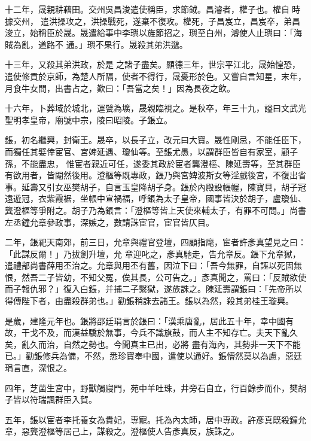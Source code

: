 \begin{pinyinscope}
 十二年，晟親耕藉田。交州吳昌浚遣使稱臣，求節鉞。昌濬者，權子也。權自時據交州，遣洪操攻之，洪操戰死，遂棄不復攻。權死，子昌岌立，昌岌卒，弟昌浚立，始稱臣於晟。晟遣給事中李璵以旌節招之，璵至白州，濬使人止璵曰：「海賊為亂，道路不
 通。」璵不果行。晟殺其弟洪邈。



 十三年，又殺其弟洪政，於是之諸子盡矣。顯德三年，世宗平江北，晟始惶恐，遣使修貢於京師，為楚人所隔，使者不得行，晟憂形於色。又嘗自言知星，末年，月食牛女間，出書占之，歎曰：「吾當之矣！」因為長夜之飲。



 十六年，卜葬域於城北，運甓為壙，晟親臨視之。是秋卒，年三十九，謚曰文武光聖明孝皇帝，廟號中宗，陵曰昭陵。子鋹立。



 鋹，初名繼興，封衛王。晟卒，以長子立，改元曰大寶。晟性剛忌，不能任臣下，而獨任其嬖倖宦官、宮婢延遇、瓊仙等。至鋹尤愚，以謂群臣皆自有家室，顧子孫，不能盡忠，
 惟宦者親近可任，遂委其政於宦者龔澄樞、陳延壽等，至其群臣有欲用者，皆閹然後用。澄樞等既專政，鋹乃與宮婢波斯女等淫戲後宮，不復出省事。延壽又引女巫樊胡子，自言玉皇降胡子身。鋹於內殿設帳幄，陳寶貝，胡子冠遠遊冠，衣紫霞裾，坐帳中宣禍福，呼鋹為太子皇帝，國事皆決於胡子，盧瓊仙、龔澄樞等爭附之。胡子乃為鋹言：「澄樞等皆上天使來輔太子，有罪不可問。」尚書左丞鐘允章參政事，深嫉之，數請誅宦官，宦官皆仄目。



 二年，鋹祀天南郊，前三日，允章與禮官登壇，四顧指麾，宦者許彥真望見之曰：「此謀反爾！」乃拔劍升壇，允
 章迎叱之，彥真馳走，告允章反。鋹下允章獄，遣禮部尚書薛用丕治之。允章與用丕有舊，因泣下曰：「吾今無罪，自誣以死固無恨，然吾二子皆幼，不知父冤，俟其長，公可告之。」彥真聞之，罵曰：「反賊欲使而子報仇邪？」復入白鋹，并捕二子繫獄，遂族誅之。陳延壽謂鋹曰：「先帝所以得傳陛下者，由盡殺群弟也。」勸鋹稍誅去諸王。鋹以為然，殺其弟桂王璇興。



 是歲，建隆元年也。鋹將邵廷琄言於鋹曰：「漢乘唐亂，居此五十年，幸中國有故，干戈不及，而漢益驕於無事，今兵不識旗鼓，而人主不知存亡。夫天下亂久矣，亂久而治，自然之勢也。今聞真主已出，必將
 盡有海內，其勢非一天下不能已。」勸鋹修兵為備，不然，悉珍寶奉中國，遣使以通好。鋹懵然莫以為慮，惡廷琄言直，深恨之。



 四年，芝菌生宮中，野獸觸寢門，苑中羊吐珠，井旁石自立，行百餘步而仆，樊胡子皆以符瑞諷群臣入賀。



 五年，鋹以宦者李托養女為貴妃，專寵。托為內太師，居中專政。許彥真既殺鐘允章，惡龔澄樞等居己上，謀殺之。澄樞使人告彥真反，族誅之。




\end{pinyinscope}
